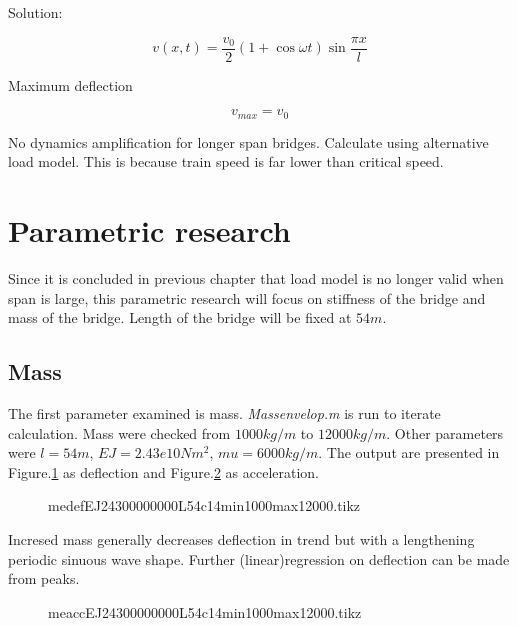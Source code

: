 Solution:

\begin{equation}
    v(x,t) = \frac{v_0}{2}(1+\cos \omega t)\sin \frac{\pi x}{l}
\end{equation}

Maximum deflection

\begin{equation}
    v_{max} = v_0
\end{equation}

No dynamics amplification for longer span bridges. Calculate using alternative load model. This is because train speed is far lower than critical speed.

\section{Parametric research}
Since it is concluded in previous chapter that load model is no longer valid when 
span is large, this parametric research will focus on stiffness of the bridge and mass of the bridge. Length of the bridge will be fixed at $54m$.

\subsection{Mass}

The first parameter examined is mass. \textit{Massenvelop.m} is run to iterate calculation. Mass were checked from $1000kg/m$ to $12000kg/m$. Other parameters were $l=54m$, $EJ=2.43e10Nm^2$, $mu=6000kg/m$. The output are presented in Figure.\ref{fig:medefEJ24300000000L54c14min1000max12000} as deflection and Figure.\ref{fig:meaccEJ24300000000L54c14min1000max12000} as acceleration.


\begin{figure}[h!]
\centering 
\setlength\figureheight{6cm} 
\setlength\figurewidth{6cm} 
 
\caption{medefEJ24300000000L54c14min1000max12000.tikz} 
\label{fig:medefEJ24300000000L54c14min1000max12000} 
\end{figure}

Incresed mass generally decreases deflection in trend but with a lengthening periodic sinuous wave shape. Further (linear)regression on deflection can be made from peaks.

\begin{figure}[h!]
\centering 
\setlength\figureheight{6cm} 
\setlength\figurewidth{6cm} 
 
\caption{meaccEJ24300000000L54c14min1000max12000.tikz} 
\label{fig:meaccEJ24300000000L54c14min1000max12000} 
\end{figure}

